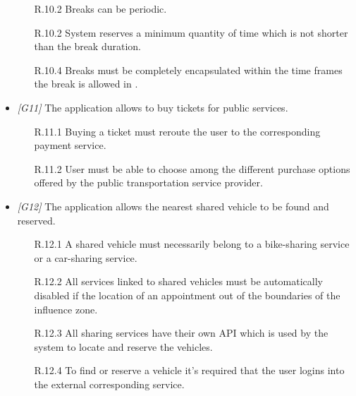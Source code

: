 \begin{itemize}
\begin{itemize}
			\item[R.10.2] Breaks can be periodic.

			\item[R.10.2] System reserves a minimum quantity of time which is not shorter than the break duration.

			\item[R.10.4] Breaks must be completely encapsulated within the time frames the break is allowed in	.

		\end{itemize}





	\item \textit{[G11]} The application allows to buy tickets for public services.

		\begin{itemize}

			\item[R.11.1] Buying a ticket must reroute the user to the corresponding payment service.

			\item[R.11.2] User must be able to choose among the different purchase options offered by the public transportation service provider.

		\end{itemize}





	\item \textit{[G12]} The application allows the nearest shared vehicle to be found and reserved.

		\begin{itemize}

			\item [R.12.1] A shared vehicle must necessarily belong to a bike-sharing service or a car-sharing service.

			\item [R.12.2] All services linked to shared vehicles must be automatically disabled if the location of an appointment out of the boundaries of the influence zone.

			\item [R.12.3] All sharing services have their own API which is used by the system to locate and reserve the vehicles.

			\item [R.12.4] To find or reserve a vehicle it's required that the user logins into the external corresponding service.


\end{itemize}
\end{itemize}

